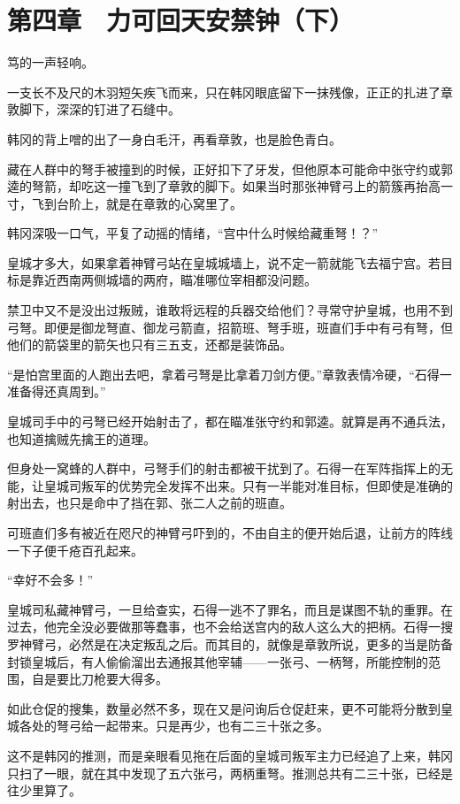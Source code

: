 \section{第四章　力可回天安禁钟（下）}

笃的一声轻响。

一支长不及尺的木羽短矢疾飞而来，只在韩冈眼底留下一抹残像，正正的扎进了章敦脚下，深深的钉进了石缝中。

韩冈的背上噌的出了一身白毛汗，再看章敦，也是脸色青白。

藏在人群中的弩手被撞到的时候，正好扣下了牙发，但他原本可能命中张守约或郭逵的弩箭，却吃这一撞飞到了章敦的脚下。如果当时那张神臂弓上的箭簇再抬高一寸，飞到台阶上，就是在章敦的心窝里了。

韩冈深吸一口气，平复了动摇的情绪，“宫中什么时候给藏重弩！？”

皇城才多大，如果拿着神臂弓站在皇城城墙上，说不定一箭就能飞去福宁宫。若目标是靠近西南两侧城墙的两府，瞄准哪位宰相都没问题。

禁卫中又不是没出过叛贼，谁敢将远程的兵器交给他们？寻常守护皇城，也用不到弓弩。即便是御龙弩直、御龙弓箭直，招箭班、弩手班，班直们手中有弓有弩，但他们的箭袋里的箭矢也只有三五支，还都是装饰品。

“是怕宫里面的人跑出去吧，拿着弓弩是比拿着刀剑方便。”章敦表情冷硬，“石得一准备得还真周到。”

皇城司手中的弓弩已经开始射击了，都在瞄准张守约和郭逵。就算是再不通兵法，也知道擒贼先擒王的道理。

但身处一窝蜂的人群中，弓弩手们的射击都被干扰到了。石得一在军阵指挥上的无能，让皇城司叛军的优势完全发挥不出来。只有一半能对准目标，但即使是准确的射出去，也只是命中了挡在郭、张二人之前的班直。

可班直们多有被近在咫尺的神臂弓吓到的，不由自主的便开始后退，让前方的阵线一下子便千疮百孔起来。

“幸好不会多！”

皇城司私藏神臂弓，一旦给查实，石得一逃不了罪名，而且是谋图不轨的重罪。在过去，他完全没必要做那等蠢事，也不会给送宫内的敌人这么大的把柄。石得一搜罗神臂弓，必然是在决定叛乱之后。而其目的，就像是章敦所说，更多的当是防备封锁皇城后，有人偷偷溜出去通报其他宰辅——一张弓、一柄弩，所能控制的范围，自是要比刀枪要大得多。

如此仓促的搜集，数量必然不多，现在又是问询后仓促赶来，更不可能将分散到皇城各处的弩弓给一起带来。只是再少，也有二三十张之多。

这不是韩冈的推测，而是亲眼看见拖在后面的皇城司叛军主力已经追了上来，韩冈只扫了一眼，就在其中发现了五六张弓，两柄重弩。推测总共有二三十张，已经是往少里算了。


